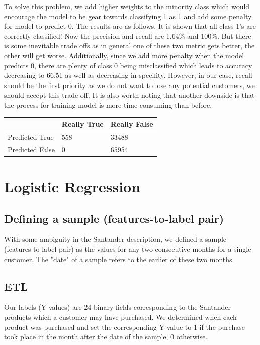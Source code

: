 \documentclass{article}
\begin{document}
\begin{spacing}{1}
\begin{large}
\begin{multicols}{2}
\end{multicols}

 To solve this problem, we add higher weights to the minority class which would encourage the model to be gear towards classifying 1 as 1 and add some penalty for model to predict 0. The results are as follows. It is shown that all class 1’s are correctly classified! Now the precision and recall are 1.64\% and 100\%. But there is some inevitable trade offs as in general one of these two metric gets better, the other will get worse. Additionally, since we add more penalty when the model predicts 0, there are plenty of class 0 being misclassified which leads to accuracy decreasing to 66.51 as well as decreasing in specifity. However, in our case, recall should be the first priority as we do not want to lose any potential customers, we should accept this trade off. It is also worth noting that another downside is that the process for training model is more time consuming than before.

\vspace{5mm}
\begin{tabular}{| l | l | l |}
	\hline
	& Really True & Really False \\ \hline
	Predicted True & 558 & 33488 \\ \hline
	Predicted False & 0 & 65954\\
	\hline
\end{tabular}
\vspace{5mm}

\section{Logistic Regression}

\subsection{Defining a sample (features-to-label pair)}

With some ambiguity in the Santander description, we defined a sample (features-to-label pair) as the values for any two consecutive months for a single customer. The "date" of a sample refers to the earlier of these two months.

\subsection{ETL}

Our labels (Y-values) are 24 binary fields corresponding to the Santander products which a customer may have purchased. We determined when each product was purchased and set the corresponding Y-value to 1 if the purchase took place in the month after the date of the sample, 0 otherwise.


\end{large}
\end{spacing}
\end{document}
